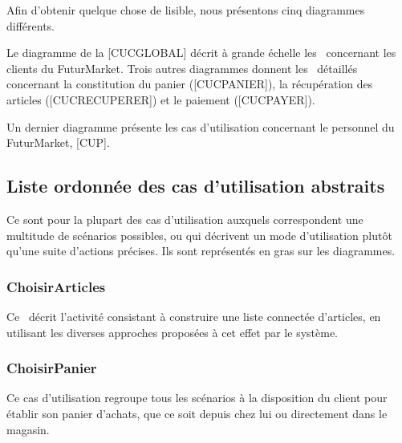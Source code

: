 Afin d'obtenir quelque chose de lisible, nous présentons cinq diagrammes différents.
\par
Le diagramme de la [CUCGLOBAL] décrit à grande échelle les \cu\ concernant les clients du FuturMarket.
Trois autres diagrammes donnent les \cu\ détaillés concernant la constitution du panier ([CUCPANIER]), la récupération des articles ([CUCRECUPERER]) et le paiement ([CUCPAYER]).
\par
Un dernier diagramme présente les cas d'utilisation concernant le personnel du FuturMarket, [CUP].


\subsection{Liste ordonnée des cas d'utilisation abstraits}

Ce sont pour la plupart des cas d'utilisation auxquels correspondent une multitude de scénarios possibles, ou qui décrivent un mode d'utilisation plutôt qu'une suite d'actions précises.
Ils sont représentés en gras sur les diagrammes.

\subsubsection{ChoisirArticles}
Ce \cu\ décrit l'activité consistant à construire une liste connectée d'articles, en utilisant les diverses approches proposées à cet effet par le système.

\subsubsection{ChoisirPanier}
Ce cas d'utilisation regroupe tous les scénarios à la disposition du client pour établir son panier d'achats, que ce soit depuis chez lui ou directement dans le magasin.


